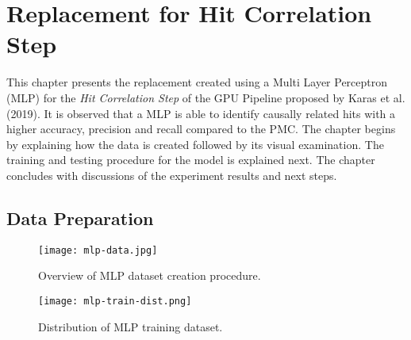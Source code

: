 
\chapter{Replacement for Hit Correlation Step} %
\label{cha:mlp}

% 
This chapter presents the replacement created using a Multi Layer
Perceptron (MLP) for the \textit{Hit Correlation Step} of the GPU
Pipeline proposed by Karas et al. (2019). It is observed that a MLP is
able to identify causally related hits with a higher accuracy,
precision and recall compared to the PMC. The chapter begins by
explaining how the data is created followed by its visual examination.
The training and testing procedure for the model is explained next.
The chapter concludes with discussions of the experiment results and
next steps.

\section{Data Preparation}
\label{sec:mlp-data-prep}

\begin{figure}[htb]
  \centering
  \begin{minipage}[t]{0.74\textwidth}
    \texttt{[image: mlp-data.jpg]}
    \caption{Overview of MLP dataset creation procedure.}
    \label{fig:mlp-data}
  \end{minipage}
  \begin{minipage}[t]{0.24\textwidth}
    \centering
    \texttt{[image: mlp-train-dist.png]}
    \caption{Distribution of MLP training dataset.}
    \label{fig:mlp-train-dist}
  \end{minipage}
\end{figure}

